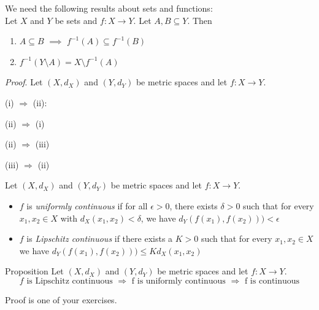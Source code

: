 \documentclass [aspectratio=169]{beamer}
\newcommand{\inv}{{-1}}
\begin{document}
\begin{frame}
We need the following results about sets and functions: \\
Let $X$ and $Y$ be sets and $f:X \to Y$. Let $A,B \subseteq Y$. Then 
\begin{enumerate}
\item $A \subseteq B$ $\implies$ $f^\inv(A) \subseteq f^\inv(B)$
\item $f^\inv(Y \setminus A) = X \setminus f^\inv(A)$
\end{enumerate}

\vspace{1em}

\textit{Proof}.
Let $(X,d_X)$ and $(Y,d_Y)$ be metric spaces and let $f:X\to Y$.

(i) $\Rightarrow$ (ii): 

\vspace{3cm}




\end{frame}


\begin{frame}

\vspace{2cm}

(ii) $\Rightarrow$ (i)

\vspace{5cm}

\end{frame}

\begin{frame}


(ii) $\Rightarrow$ (iii)

\vspace{4cm}
(iii) $\Rightarrow$ (ii) 
\vspace{2cm}

\end{frame}



\begin{frame}
\begin{definition}
Let $(X,d_X)$ and $(Y,d_Y)$ be metric spaces and let $f:X\to Y$. 
\begin{itemize}
    \item $f$ is \emph{uniformly continuous} if for all $\epsilon>0$, there exists $\delta > 0$ such that for every $x_1,x_2\in X$ with $d_X(x_1,x_2) < \delta$, we have  $d_Y(f(x_1),f(x_2))) < \epsilon$ 
    \item $f$ is \emph{Lipschitz continuous} if there exists a $K > 0$ such that for every $x_1,x_2\in X$ we have  $d_Y(f(x_1),f(x_2))) \leq K d_X(x_1,x_2)$
\end{itemize}
\end{definition}

\begin{exampleblock}{Proposition}
Let $(X,d_X)$ and $(Y,d_Y)$ be metric spaces and let $f:X\to Y$. 
$$f \text{ is Lipschitz continuous } \Rightarrow \text{ f is uniformly continuous } \Rightarrow \text{ f is continuous}$$
\end{exampleblock}
Proof is one of your exercises.
\end{frame}
\end{document}
